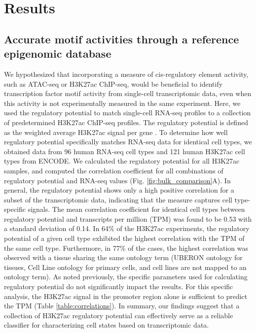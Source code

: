 \section{Results}

\subsection{Accurate motif activities through a reference epigenomic database}

We hypothesized that incorporating a measure of cis-regulatory element activity, such as ATAC-seq or H3K27ac ChIP-seq, would be beneficial to identify transcription factor motif activity from single-cell transcriptomic data, even when this activity is not experimentally measured in the same experiment. Here, we used the regulatory potential to match single-cell RNA-seq profiles to a collection of predetermined H3K27ac ChIP-seq profiles. The regulatory potential is defined as the weighted average H3K27ac signal per gene \cite{Wang2016}. To determine how well regulatory potential specifically matches RNA-seq data for identical  cell types, we obtained data from 96 human RNA-seq cell types and 121 human H3K27ac cell types from ENCODE\cite{encode_dcc}. We calculated the regulatory potential for all H3K27ac samples, and computed the correlation coefficient for all combinations of regulatory potential and RNA-seq values (Fig. \ref{fig:bulk_comparison}A). In general, the regulatory potential shows only a high positive correlation for a subset of the transcriptomic data, indicating that the measure captures cell type-specific signals. The mean correlation coefficient for identical cell types between regulatory potential and transcripts per million (TPM) was found to be 0.53 with a standard deviation of 0.14. In 64\% of the H3K27ac experiments, the regulatory potential of a given cell type exhibited the highest correlation with the TPM of the same cell type. Furthermore, in 77\% of the cases, the highest correlation was observed with a tissue sharing the same ontology term (UBERON ontology for tissues, Cell Line ontology for primary cells, and cell lines are not mapped to an ontology term). As noted previously\cite{Wang2016}, the specific parameters used for calculating regulatory potential do not significantly impact the results. For this specific analysis, the H3K27ac signal in the promoter region alone is sufficient to predict the TPM (Table \ref{table:correlations}). In summary, our findings suggest that a collection of H3K27ac regulatory potential can effectively serve as a reliable classifier for characterizing cell states based on transcriptomic data.

